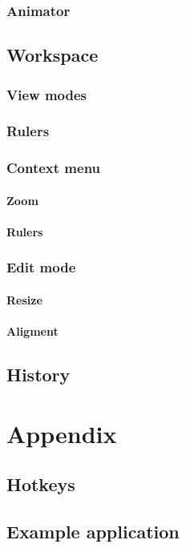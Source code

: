\documentclass[titlepage,oneside,11pt]{book}
\begin{document}
\subsection{Animator}
\section{Workspace}
\subsection{View modes}
\subsection{Rulers}
\subsection{Context menu}
\subsubsection{Zoom}
\subsubsection{Rulers}
\subsection{Edit mode}
\subsubsection{Resize}
\subsubsection{Aligment}
\section{History}
\chapter{Appendix}
\section{Hotkeys}
\section{Example application}
\end{document}
